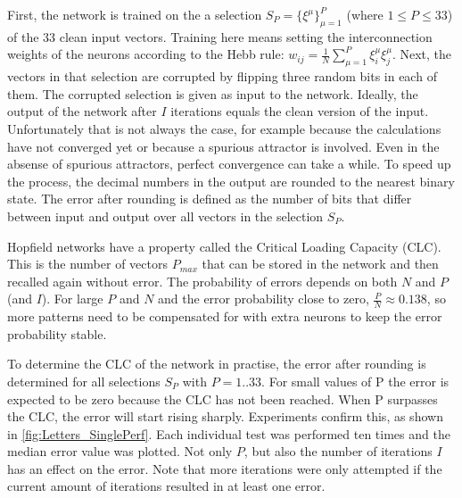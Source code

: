 \documentclass[a4, 10pt, twoside, twocolumn]{article}
\numberwithin{figure}{section}
\begin{document}
First, the network is trained on the a selection $S_P = \{\xi^\mu\}_{\mu=1}^P$ (where $1 \leq P \leq 33$) of the 33 clean input vectors. Training here means setting the interconnection weights of the neurons according to the Hebb rule: $w_{ij} = \frac{1}{N} \sum_{\mu=1}^{P}\xi_i^\mu \xi_j^\mu$. Next, the vectors in that selection are corrupted by flipping three random bits in each of them. The corrupted selection is given as input to the network. Ideally, the output of the network after $I$ iterations equals the clean version of the input. Unfortunately that is not always the case, for example because the calculations have not converged yet or because a spurious attractor is involved. Even in the absense of spurious attractors, perfect convergence can take a while. To speed up the process, the decimal numbers in the output are rounded to the nearest binary state. The error after rounding is defined as the number of bits that differ between input and output over all vectors in the selection $S_P$.

Hopfield networks have a property called the Critical Loading Capacity (CLC). This is the number of vectors $P_{max}$ that can be stored in the network and then recalled again without error. The probability of errors depends on both $N$ and $P$ (and $I$). For large $P$ and $N$ and the error probability close to zero, $\frac{P}{N} \approx 0.138$, so more patterns need to be compensated for with extra neurons to keep the error probability stable.

To determine the CLC of the network in practise, the error after rounding is determined for all selections $S_P$ with $P=1..33$. For small values of P the error is expected to be zero because the CLC has not been reached. When P surpasses the CLC, the error will start rising sharply. Experiments confirm this, as shown in \autoref{fig:Letters_SinglePerf}. Each individual test was performed ten times and the median error value was plotted. Not only $P$, but also the number of iterations $I$ has an effect on the error. Note that more iterations were only attempted if the current amount of iterations resulted in at least one error.
\end{document}
